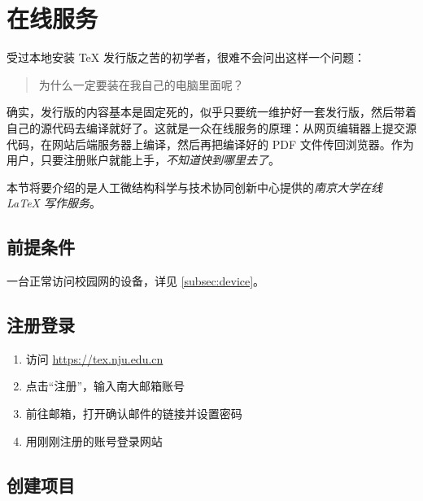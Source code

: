 \section{在线服务}
\label{sec:online}

\begin{widepar}
受过本地安装 \TeX{} 发行版之苦的初学者，很难不会问出这样一个问题：
\end{widepar}

\begin{quote}
\kaishu 为什么一定要装在我自己的电脑里面呢？
\end{quote}

\begin{widepar}
确实，发行版的内容基本是固定死的，似乎只要统一维护好一套发行版，然后带着自己的源代码去编译就好了。这就是一众在线服务的原理：从网页编辑器上提交源代码，在网站后端服务器上编译，然后再把编译好的 PDF 文件传回浏览器。作为用户，只要注册账户就能上手，\emph{不知道快到哪里去了}。
\end{widepar}

\medskip

本节将要介绍的是人工微结构科学与技术协同创新中心提供的\emph{南京大学在线 \LaTeX{} 写作服务}。

\subsection{前提条件}

一台正常访问校园网的设备，详见 \ref{subsec:device}。

\subsection{注册登录}

\begin{enumerate}
  \item 访问 \url{https://tex.nju.edu.cn}
  \item 点击“注册”，输入南大邮箱账号
  \item 前往邮箱，打开确认邮件的链接并设置密码
  \item 用刚刚注册的账号登录网站
\end{enumerate}

\subsection{创建项目}

